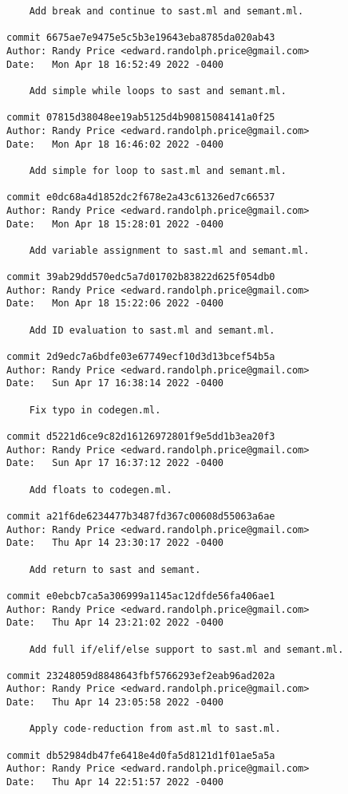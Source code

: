 {\begin{verbatim}
    Add break and continue to sast.ml and semant.ml.

commit 6675ae7e9475e5c5b3e19643eba8785da020ab43
Author: Randy Price <edward.randolph.price@gmail.com>
Date:   Mon Apr 18 16:52:49 2022 -0400

    Add simple while loops to sast and semant.ml.

commit 07815d38048ee19ab5125d4b90815084141a0f25
Author: Randy Price <edward.randolph.price@gmail.com>
Date:   Mon Apr 18 16:46:02 2022 -0400

    Add simple for loop to sast.ml and semant.ml.

commit e0dc68a4d1852dc2f678e2a43c61326ed7c66537
Author: Randy Price <edward.randolph.price@gmail.com>
Date:   Mon Apr 18 15:28:01 2022 -0400

    Add variable assignment to sast.ml and semant.ml.

commit 39ab29dd570edc5a7d01702b83822d625f054db0
Author: Randy Price <edward.randolph.price@gmail.com>
Date:   Mon Apr 18 15:22:06 2022 -0400

    Add ID evaluation to sast.ml and semant.ml.

commit 2d9edc7a6bdfe03e67749ecf10d3d13bcef54b5a
Author: Randy Price <edward.randolph.price@gmail.com>
Date:   Sun Apr 17 16:38:14 2022 -0400

    Fix typo in codegen.ml.

commit d5221d6ce9c82d16126972801f9e5dd1b3ea20f3
Author: Randy Price <edward.randolph.price@gmail.com>
Date:   Sun Apr 17 16:37:12 2022 -0400

    Add floats to codegen.ml.

commit a21f6de6234477b3487fd367c00608d55063a6ae
Author: Randy Price <edward.randolph.price@gmail.com>
Date:   Thu Apr 14 23:30:17 2022 -0400

    Add return to sast and semant.

commit e0ebcb7ca5a306999a1145ac12dfde56fa406ae1
Author: Randy Price <edward.randolph.price@gmail.com>
Date:   Thu Apr 14 23:21:02 2022 -0400

    Add full if/elif/else support to sast.ml and semant.ml.

commit 23248059d8848643fbf5766293ef2eab96ad202a
Author: Randy Price <edward.randolph.price@gmail.com>
Date:   Thu Apr 14 23:05:58 2022 -0400

    Apply code-reduction from ast.ml to sast.ml.

commit db52984db47fe6418e4d0fa5d8121d1f01ae5a5a
Author: Randy Price <edward.randolph.price@gmail.com>
Date:   Thu Apr 14 22:51:57 2022 -0400


\end{verbatim}}
